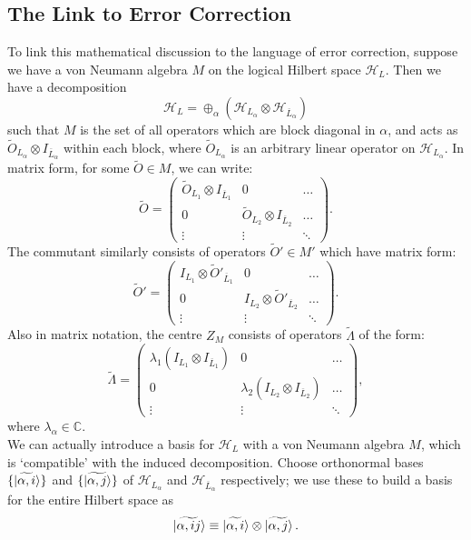 \documentclass[12pt,a4paper]{report}
\numberwithin{equation}{section}
\newcommand{\ol}[1]{\overline{#1}}
\theoremstyle{definition}
\theoremstyle{theorem}
\theoremstyle{theorem}
\theoremstyle{example}
\theoremstyle{definition}
\begin{document}
\subsection{The Link to Error Correction}
To link this mathematical discussion to the language of error correction, suppose we have a von Neumann algebra $M$ on the logical Hilbert space $\mathcal{H}_{L}$. Then we have a decomposition
\begin{equation}\label{decomp}
	\mathcal{H}_{L}=\oplus_{\alpha}(\mathcal{H}_{L_{\alpha}}\otimes\mathcal{H}_{\ol{L}_{\alpha}})
\end{equation} 
such that $M$ is the set of all operators which are block diagonal in $\alpha$, and acts as $\tilde{O}_{L_{\alpha}}\otimes I_{\ol{L}_{\alpha}}$ within each block, where $\tilde{O}_{L_{\alpha}}$ is an arbitrary linear operator on $\mathcal{H}_{L_{\alpha}}$. In matrix form, for some $\tilde{O}\in M$, we can write:
\begin{equation}\label{thing1}
	\tilde{O}=\begin{pmatrix}
		\tilde{O}_{L_{1}}\otimes I_{\ol{L}_{1}}&0&\dots\\
		0&\tilde{O}_{L_{2}}\otimes I_{\ol{L}_{2}}&\dots\\
		\vdots&\vdots&\ddots
	\end{pmatrix}.
\end{equation}
The commutant similarly consists of operators $\tilde{O}'\in M'$ which have matrix form:
\begin{equation}
	\tilde{O}'=\begin{pmatrix}
		I_{L_{1}}\otimes\tilde{O}'_{\ol{L}_{1}}&0&\dots\\
		0&I_{L_{2}}\otimes\tilde{O}'_{\ol{L}_{2}}&\dots\\
		\vdots&\vdots&\ddots
	\end{pmatrix}.
\end{equation}
Also in matrix notation, the centre $Z_{M}$ consists of operators $\tilde{\Lambda}$ of the form:
\begin{equation}
	\tilde{\Lambda}=\begin{pmatrix}
		\lambda_{1}(I_{L_{1}}\otimes I_{\ol{L}_{1}})&0&\dots\\
		0&\lambda_{2}(I_{L_{2}}\otimes I_{\ol{L}_{2}})&\dots\\
		\vdots&\vdots&\ddots
	\end{pmatrix},
\end{equation}
where $\lambda_{\alpha}\in\mathbb{C}$.\\
We can actually introduce a basis for $\mathcal{H}_{L}$ with a von Neumann algebra $M$, which is `compatible' with the induced decomposition. Choose orthonormal bases $\{\ket{\widetilde{\alpha,i}}\}$ and $\{\ket{\widetilde{\alpha,j}}\}$ of $\mathcal{H}_{L_{\alpha}}$ and $\mathcal{H}_{\ol{L}_{\alpha}}$ respectively; we use these to build a basis for the entire Hilbert space as
\begin{equation}\label{basis}
	\ket{\widetilde{\alpha,ij}}\equiv\ket{\widetilde{\alpha,i}}\otimes\ket{\widetilde{\alpha,j}}.
\end{equation}
\end{document}
